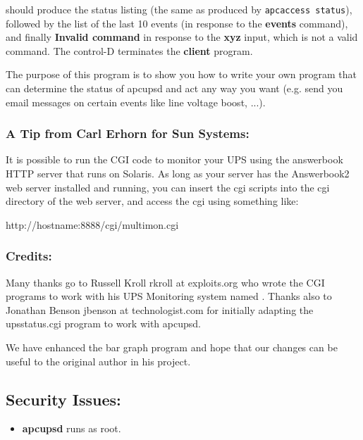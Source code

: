 {{{{{should produce the status listing (the same as produced by {\tt apcaccess
status}), followed by the list of the last 10 events (in response to the {\bf
events} command), and finally {\bf Invalid command} in response to the {\bf
xyz} input, which is not a valid command. The control-D terminates the {\bf
client} program.  

The purpose of this program is to show you how to write your own program that
can determine the status of apcupsd and act any way you want (e.g. send you
email messages on certain events like line voltage boost, ...). 

\label{A-Tip-from-Carl-Erhorn-for-Sun-Systems}

\subsubsection*{A Tip from Carl Erhorn for Sun Systems:}

\label{index-Tip-137}
It is possible to run the CGI code to monitor your UPS using the answerbook
HTTP server that runs on Solaris. As long as your server has the Answerbook2
web server installed and running, you can insert the cgi scripts into the cgi
directory of the web server, and access the cgi using something like:  

http://hostname:8888/cgi/multimon.cgi 

\label{Credits}

\subsubsection*{Credits:}

Many thanks go to Russell Kroll \lt{}rkroll at exploits.org\gt{} who wrote the
CGI programs to work with his UPS Monitoring system named 
. Thanks also to
Jonathan Benson \lt{}jbenson at technologist.com\gt{} for initially adapting
the upsstatus.cgi program to work with apcupsd.  

We have enhanced the bar graph program and hope that our changes can be useful
to the original author in his project. 

\label{Security-Issues}

\subsection*{Security Issues:}

\begin{itemize}
\item {\bf apcupsd} runs as root.  


\end{itemize}}}}}}
